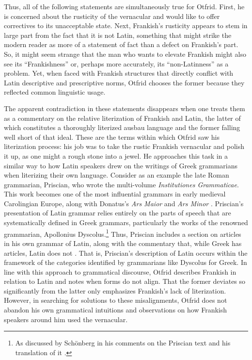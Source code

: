 \noindent Thus, all of the following statements are simultaneously true for Otfrid. First, he is concerned about the rusticity of the vernacular and would like to offer correctives to its unacceptable state. Next, Frankish’s rusticity appears to stem in large part from the fact that it is not Latin, something that might strike the modern reader as more of a statement of fact than a defect on Frankish’s part. So, it might seem strange that the man who wants to elevate Frankish might also see its “Frankishness” or, perhaps more accurately, its “non-Latinness” as a problem. Yet, when faced with Frankish structures that directly conflict with Latin descriptive and prescriptive norms, Otfrid chooses the former because they reflected common linguistic usage.

The apparent contradiction in these statements disappears when one treats them as a commentary on the relative literization of Frankish and Latin, the latter of which constitutes a thoroughly literized ausbau language and the former falling well short of that ideal. These are the terms within which Otfrid saw his literization process: his job was to take the rustic Frankish vernacular and polish it up, as one might a rough stone into a jewel. He approaches this task in a similar way to how Latin speakers drew on the writings of Greek grammarians when literizing their own language. Consider as an example the late Roman grammarian, Priscian, who wrote the multi-volume \textit{Institutiones Grammaticae}. This work becomes one of the most influential grammars in early medieval Carolingian Europe, along with Donatus’s \textit{Ars Maior} and \textit{Ars Minor} \citep[504]{AurouxEtAl2000}. Priscian’s presentation of Latin grammar relies entirely on the parts of speech that are systematically defined in Greek grammars, particularly the works of the renowned grammarian, Apollonius Dyscolus.\footnote{\textrm{As discussed by Schönberg in his comments on the Priscian text and his translation of it \citep[487]{Priscian2010}.} } Thus, Priscian includes a section on articles in his own grammar of Latin, along with the commentary that, while Greek has articles, Latin does not \citep[99]{Priscian2010}. That is, Priscian’s description of Latin occurs within the framework of the categories identified by grammarians like Dyscolus for Greek. In line with this approach to grammatical discourse, Otfrid describes Frankish in relation to Latin and notes when forms do not align. That the former deviates so significantly from the latter only emphasizes Frankish’s lack of literization. However, in searching for solutions to these misalignments, Otfrid does not abandon his own grammatical intuitions and observations on how Frankish speakers around him used the vernacular.\largerpage

